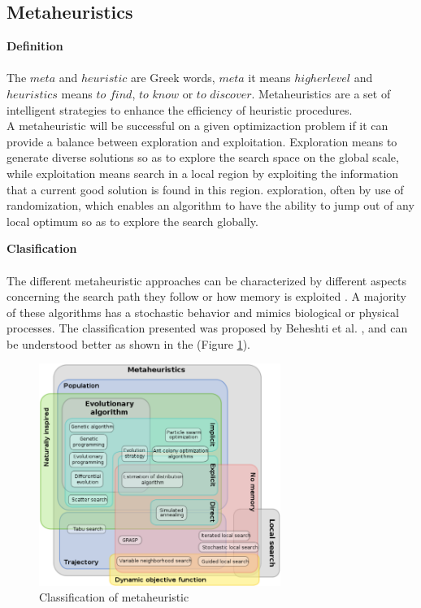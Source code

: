 \subsection{Metaheuristics}
\textbf{Definition}
~\\
~\\
The $meta$ and $heuristic$ are Greek words, $meta$ it means $higher level$ and $heuristics$ means $to$ $find$, $to$ $know$ or $to$ $discover$. Metaheuristics are a set of intelligent strategies to enhance the efficiency of heuristic procedures.\\
A metaheuristic will be successful on a given optimizaction problem if it can provide a balance between exploration and exploitation. Exploration means to generate diverse solutions so as to explore the search space on the global scale, while exploitation means search in a local region by exploiting the information that a current good solution is found in this region.
exploration, often by use of randomization, which enables an algorithm to have the ability to jump out of any local optimum so as to explore the search globally.

\textbf{Clasification}
~\\
~\\
The different metaheuristic approaches can be characterized by different aspects concerning the search path they follow or how memory is exploited \cite{citeulike:1859945}. A majority of these algorithms has a stochastic behavior and mimics biological or  physical processes. The classification presented was proposed by Beheshti et al. \cite{Beheshti:2014:CCA:2563733.2564085}, and can be understood better as shown in the (Figure \ref{fig:classification-of-mh}).

\squeezeup
\begin{figure}[ht]
	\centering
  \includegraphics[width=0.70\textwidth]{MarcoTeorico/imagenes/classification_mh.png}
	\caption{Classification of metaheuristic}\label{fig:classification-of-mh}
\end{figure}
\squeezeup



